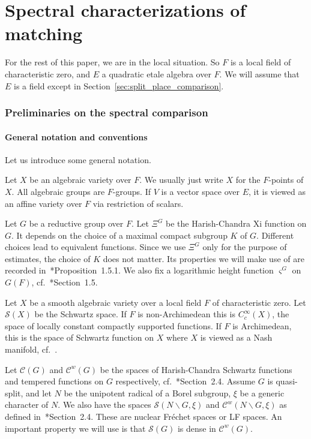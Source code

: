 \documentclass[letterpaper,11pt]{amsart}
\newcommand{\cC}{\mathcal{C}}
\newcommand{\cS}{\mathcal{S}}
\newcommand{\bs}{\backslash}
\newcommand{\<}{\negthickspace}
\theoremstyle{definition}
\theoremstyle{plain}
\theoremstyle{remark}
\numberwithin{equation}{section}
\begin{document}
 



\part{Spectral characterizations of matching}

For the rest of this paper, we are in the local situation. So $F$ is a
local field of characteristic zero, and $E$ a quadratic etale algebra over
$F$. We will assume that $E$ is a field except in
Section~\ref{sec:split_place_comparison}.




\section{Preliminaries on the spectral comparison}




\subsection{General notation and conventions}
Let us introduce some general notation.

Let $X$ be an algebraic variety over $F$. We usually just write $X$ for the
$F$-points of $X$. All algebraic groups are $F$-groups. If $V$ is a vector
space over $E$, it is viewed as an affine variety over $F$ via restriction of
scalars.



Let $G$ be a reductive group over $F$. Let $\Xi^G$ be the Harish-Chandra Xi
function on $G$. It depends on the choice of a maximal compact subgroup $K$
of $G$. Different choices lead to equivalent functions. Since we use $\Xi^G$
only for the purpose of estimates, the choice of $K$ does not matter. Its
properties we will make use of are recorded
in~\cite{BP2}*{Proposition~1.5.1}. We also fix a logarithmic height function
$\varsigma^G$ on $G(F)$, cf.~\cite{BP2}*{Section~1.5}.

Let $X$ be a smooth algebraic variety over a local field $F$ of
characteristic zero. Let $\cS(X)$ be the Schwartz space. If $F$ is
non-Archimedean this is $C_c^\infty(X)$, the space of locally constant
compactly supported functions. If $F$ is Archimedean, this is the space of
Schwartz function on $X$ where $X$ is viewed as a Nash manifold,
cf.~\cite{AG}.


Let $\cC(G)$ and $\cC^w(G)$ be the spaces of Harish-Chandra Schwartz functions and
tempered functions on $G$ respectively, cf.~\cite{BP1}*{Section~2.4}. Assume
$G$ is quasi-split, and let $N$ be the unipotent radical of a Borel subgroup,
$\xi$ be a generic character of $N$. We also have the spaces $\cS(N \bs G,
\xi)$ and $\cC^w(N \bs G, \xi)$ as defined in~\cite{BP1}*{Section~2.4}. These
are nuclear Fr\'{e}chet spaces or LF spaces. An important property we will use is
that $\cS(G)$ is dense in $\cC^w(G)$.
\end{document}

